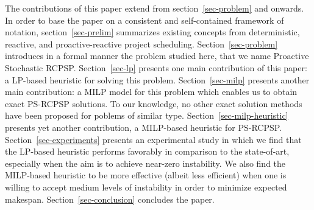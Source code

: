 	The contributions of this paper extend from section~\ref{sec-problem} and onwards.
	In order to base the paper on a consistent and self-contained framework of notation,
	section~\ref{sec-prelim} summarizes existing concepts from
	deterministic, reactive, and proactive-reactive project scheduling.
 	Section~\ref{sec-problem} introduces in a formal manner the problem studied here,
 	that we name Proactive Stochastic RCPSP.
	Section~\ref{sec-lp} presents one main contribution of this paper:
	a LP-based heuristic for solving this problem.
 	Section~\ref{sec-milp} presents another main contribution:
 	a MILP model for this problem which enables us to obtain exact PS-RCPSP solutions.
 	To our knowledge, no other exact solution methods have been proposed for poblems of similar type.
	Section~\ref{sec-milp-heuristic} presents yet another contribution,
	a MILP-based heuristic for PS-RCPSP.
	Section~\ref{sec-experiments} presents an experimental study in which we find
	that the LP-based heuristic performs favorably in comparison to the state-of-art,
	especially when the aim is to achieve near-zero instability.
	We also find the MILP-based heuristic to be more effective (albeit less efficient)
	when one is willing to accept medium levels of instability in order to minimize expected makespan.
	Section~\ref{sec-conclusion} concludes the paper.	
 	
